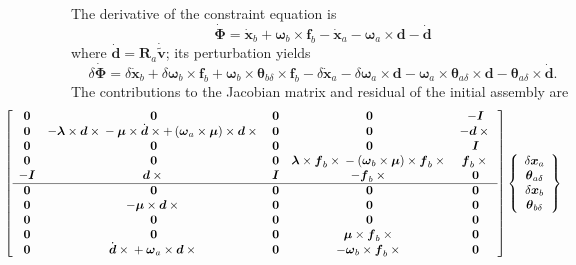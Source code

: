 \documentclass[10pt,dvips,fleqn,subeqn]{report}
\newcommand{\T}[1]{\boldsymbol{#1}}
\begin{document}
The derivative of the constraint equation is
\begin{equation}
	\dot{\T{\Phi}} = 
		\dot{\T{x}}_b
		+ \T{\omega}_b \times \T{f}_b
		- \dot{\T{x}}_a
		- \T{\omega}_a \times \T{d}
		- \dot{\T{d}}
\end{equation}
where $\dot{\T{d}}=\T{R}_a\dot{\tilde{\T{v}}}$; its perturbation yields
\begin{equation}
	\delta\dot{\T{\Phi}}
	= \delta\dot{\T{x}}_b
	+ \delta\T{\omega}_b \times \T{f}_b
	+ \T{\omega}_b \times \T{\theta}_{b\delta} \times \T{f}_b
	- \delta\dot{\T{x}}_a
	- \delta\T{\omega}_a \times \T{d}
	- \T{\omega}_a \times \T{\theta}_{a\delta} \times \T{d}
	- \T{\theta}_{a\delta} \times \dot{\T{d}} .
\end{equation}
The contributions to the Jacobian matrix and residual 
of the initial assembly are
\begin{align}
	\small
	& \hspace{-20mm}\sqbr{\matr{ccccc}{
		\T{0} & \T{0} & \T{0} & \T{0} & -\T{I} \\	%
		\T{0} & -\T{\lambda}\times\T{d}\times{}
			- \T{\mu}\times\dot{\T{d}}\times
			+ \plbr{\T{\omega}_a\times\T{\mu}}\times\T{d}\times{} &
			\T{0} & \T{0} & -\T{d}\times{} \\	%
		\T{0} & \T{0} & \T{0} & \T{0} & \T{I} \\	%
		\T{0} & \T{0} & \T{0} & 
			\T{\lambda}\times\T{f}_b\times{}
			- \plbr{\T{\omega}_b\times\T{\mu}}\times\T{f}_b\times{} &
			\T{f}_b\times{} \\	%
		-\T{I} & \T{d}\times{} & \T{I} & -\T{f}_b\times{} &
			\T{0} \\				%
%
	\hline
		\T{0} & \T{0} & \T{0} & \T{0} & \T{0} \\	%
		\T{0} & -\T{\mu}\times\T{d}\times{} &
			\T{0} & \T{0} & \T{0} \\		%
		\T{0} & \T{0} & \T{0} & \T{0} & \T{0} \\	%
		\T{0} & \T{0} & \T{0} &
			\T{\mu}\times\T{f}_b\times{} & \T{0} \\	%
		\T{0} &
			\dot{\T{d}}\times{}
			+ \T{\omega}_a\times\T{d}\times{} &
			\T{0} &
			-\T{\omega}_b\times\T{f}_b\times{} &
			\T{0}					%
	}} \cubr{\cvvect{
		\delta\T{x}_a \\
		\T{\theta}_{a\delta} \\
		\delta\T{x}_b \\
		\T{\theta}_{b\delta} \\
}}
\end{align}
\end{document}

